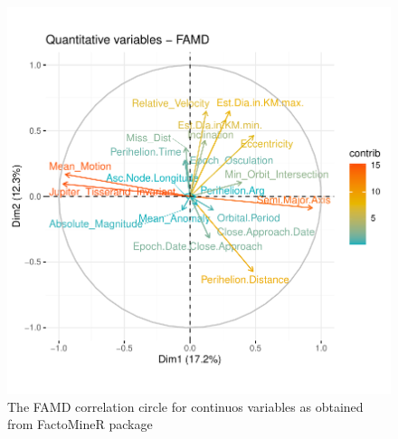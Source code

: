 \documentclass[12pt,%
               a4paper,%
               oneside,openany,%
               titlepage,%
               headinclude,footinclude,%
               BCOR5mm,%
               cleardoublepage=empty,%
               tablecaptionabove,%
               floatperchapter,
               ]{scrreprt}                 %
\begin{document}
\begin{figure}[h]
\begin{center}
\includegraphics[width=1\textwidth]{Figures/FAMD_Quantitative variables.pdf}
\caption{The FAMD correlation circle for continuos variables as obtained from FactoMineR package \cite{le2008factominer}}
\label{FAMD_Quantitative variables}
\end{center}
\end{figure}
\end{document}
